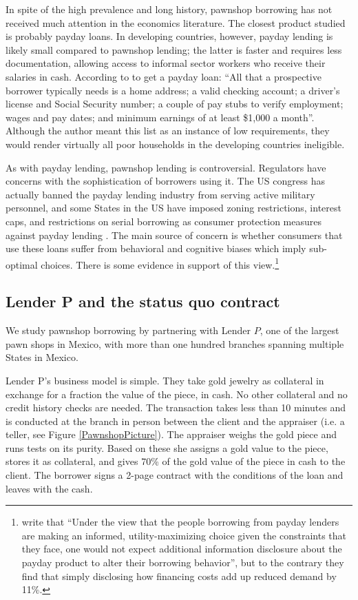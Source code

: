 \documentclass[oneside,11pt]{article}
\begin{document}
In spite of the high prevalence and long history, pawnshop borrowing has not received much attention in the economics literature. The closest product studied is probably payday loans. In developing countries, however, payday lending is likely small compared to pawnshop lending; the latter is faster and requires less documentation, allowing access to informal sector workers who receive their salaries in cash. According to \cite{Payday} to get a payday loan: ``All that a prospective borrower typically needs is a home address; a valid checking account; a driver’s license and Social Security number; a couple of pay stubs to verify employment; wages and pay dates; and minimum earnings of at least \$1,000 a month''. Although the author meant this list as an instance of low requirements, they would render virtually all poor households in the developing countries ineligible. 

As with payday lending, pawnshop lending is controversial. Regulators have concerns with the sophistication of borrowers using it. The US congress has actually banned the payday lending industry from serving active military personnel, and some States in the US have imposed zoning restrictions, interest caps, and restrictions on serial borrowing as consumer protection measures against payday lending \citep{Payday}. The main source of concern is whether consumers that use these loans suffer from behavioral and cognitive biases which imply sub-optimal choices. There is some evidence  in support of this view.\footnote{\cite{Bertrand} write that ``Under the view that the people borrowing from payday lenders are making an informed, utility-maximizing choice given the constraints that they face, one  would not expect additional information disclosure about the payday product to  alter their borrowing behavior'', but to the contrary they find that simply disclosing how financing costs add up reduced demand by 11\%. %
} 


\subsection{Lender P and the status quo contract}

We study pawnshop borrowing by partnering with Lender $P$, one of the largest pawn shops in Mexico, with more than one hundred branches spanning multiple States in Mexico. 

Lender P's business model is simple. They take gold jewelry as collateral in exchange for a fraction the value of the piece, in cash. No other collateral and no credit history checks are needed. The transaction takes less than 10 minutes and is conducted at the branch in person between the client and the appraiser (i.e. a teller, see Figure \ref{PawnshopPicture}). The appraiser weighs the gold piece and runs tests on its purity. Based on these she assigns a gold value to the piece, stores it as collateral, and gives 70\% of the gold value of the piece in cash to the client. The borrower signs a 2-page contract with the conditions of the loan and leaves with the cash.
\end{document}
